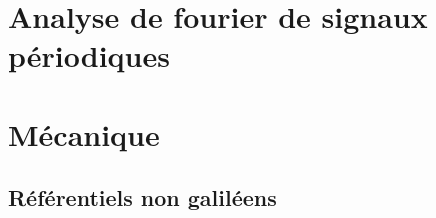 
\section{Analyse de fourier de signaux périodiques}


\section{Mécanique}
\subsection{Référentiels non galiléens}


